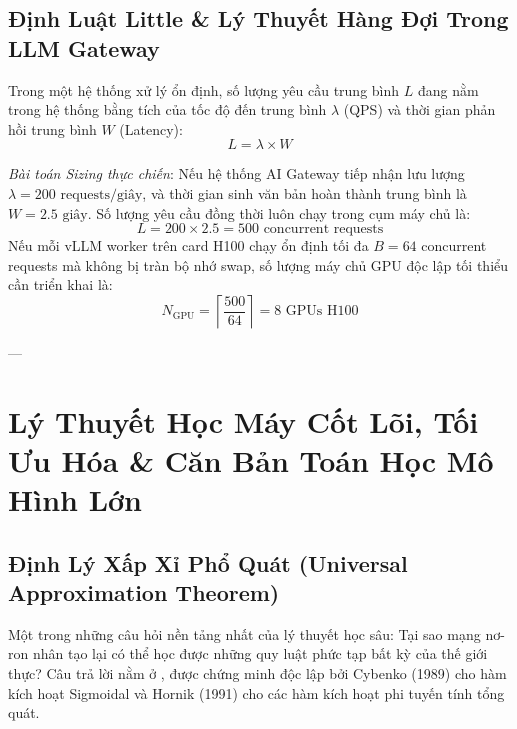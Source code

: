 \subsection{Định Luật Little \& Lý Thuyết Hàng Đợi Trong LLM Gateway}

\begin{theorem}
Trong một hệ thống xử lý ổn định, số lượng yêu cầu trung bình $L$ đang nằm trong hệ thống bằng tích của tốc độ đến trung bình $\lambda$ (QPS) và thời gian phản hồi trung bình $W$ (Latency):
\begin{equation}
L = \lambda \times W
\end{equation}
\end{theorem}

\textit{Bài toán Sizing thực chiến}: Nếu hệ thống AI Gateway tiếp nhận lưu lượng $\lambda = 200\text{ requests/giây}$, và thời gian sinh văn bản hoàn thành trung bình là $W = 2.5\text{ giây}$.
Số lượng yêu cầu đồng thời luôn chạy trong cụm máy chủ là:
\begin{equation*}
L = 200 \times 2.5 = 500\text{ concurrent requests}
\end{equation*}
Nếu mỗi vLLM worker trên card H100 chạy ổn định tối đa $B = 64$ concurrent requests mà không bị tràn bộ nhớ swap, số lượng máy chủ GPU độc lập tối thiểu cần triển khai là:
\begin{equation*}
N_{\text{GPU}} = \left\lceil \frac{500}{64} \right\rceil = 8\text{ GPUs H100}
\end{equation*}

---

\section{Lý Thuyết Học Máy Cốt Lõi, Tối Ưu Hóa \& Căn Bản Toán Học Mô Hình Lớn}
\label{sec:app-math-deep-theory}

\subsection{Định Lý Xấp Xỉ Phổ Quát (Universal Approximation Theorem)}
Một trong những câu hỏi nền tảng nhất của lý thuyết học sâu: Tại sao mạng nơ-ron nhân tạo lại có thể học được những quy luật phức tạp bất kỳ của thế giới thực? Câu trả lời nằm ở , được chứng minh độc lập bởi Cybenko (1989) cho hàm kích hoạt Sigmoidal và Hornik (1991) cho các hàm kích hoạt phi tuyến tính tổng quát.

